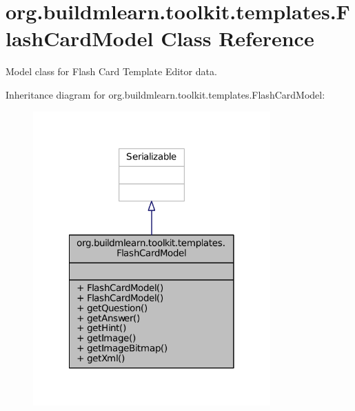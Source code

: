 \hypertarget{classorg_1_1buildmlearn_1_1toolkit_1_1templates_1_1FlashCardModel}{\section{org.\-buildmlearn.\-toolkit.\-templates.\-Flash\-Card\-Model Class Reference}
\label{classorg_1_1buildmlearn_1_1toolkit_1_1templates_1_1FlashCardModel}
}


Model class for Flash Card Template Editor data.  




Inheritance diagram for org.\-buildmlearn.\-toolkit.\-templates.\-Flash\-Card\-Model\-:
\nopagebreak
\begin{figure}[H]
\begin{center}
\leavevmode
\includegraphics[width=258pt]{df/d5d/classorg_1_1buildmlearn_1_1toolkit_1_1templates_1_1FlashCardModel__inherit__graph}
\end{center}
\end{figure}


